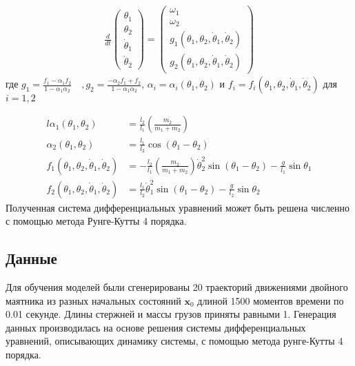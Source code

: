 \documentclass[12pt]{article}
\begin{document}
$$
\begin{array}{c}
\frac{d}{d t}\left(\begin{array}{c}
\theta_{1} \\
\theta_{2} \\
\dot{\theta}_{1} \\
\dot{\theta}_{2}
\end{array}\right)=\left(\begin{array}{c}
\omega_{1} \\
\omega_{2} \\
g_{1}\left(\theta_{1}, \theta_{2}, \dot{\theta}_{1}, \dot{\theta}_{2}\right) \\
g_{2}\left(\theta_{1}, \theta_{2}, \dot{\theta}_{1}, \dot{\theta}_{2}\right)
\end{array}\right)
\end{array}
$$
где $g_{1}=\frac{f_{1}-\alpha_{1} f_{2}}{1-\alpha_{1} \alpha_{2}} \quad, g_{2}=\frac{-\alpha_{2} f_{1}+f_{2}}{1-\alpha_{1} \alpha_{2}}$, $\alpha_{i}=\alpha_{i}\left(\theta_{1}, \theta_{2}\right)$ и $f_{i}=f_{i}\left(\theta_{1}, \theta_{2}, \dot{\theta}_{1}, \dot{\theta}_{2}\right)$ для $i=1,2$

$$
\begin{aligned}{l}
\alpha_{1}\left(\theta_{1}, \theta_{2}\right) & =\frac{l_{2}}{l_{1}}\left(\frac{m_{2}}{m_{1}+m_{2}}\right) \\
\alpha_{2}\left(\theta_{1}, \theta_{2}\right) &=\frac{l_{1}}{l_{2}} \cos \left(\theta_{1}-\theta_{2}\right) \\
f_{1}\left(\theta_{1}, \theta_{2}, \dot{\theta}_{1}, \dot{\theta}_{2}\right) & =-\frac{l_{2}}{l_{1}}\left(\frac{m_{2}}{m_{1}+m_{2}}\right) \dot{\theta}_{2}^{2} \sin \left(\theta_{1}-\theta_{2}\right)-\frac{g}{l_{1}} \sin \theta_{1} \\
f_{2}\left(\theta_{1}, \theta_{2}, \dot{\theta}_{1}, \dot{\theta}_{2}\right) & =\frac{l_{1}}{l_{2}} \dot{\theta}_{1}^{2} \sin \left(\theta_{1}-\theta_{2}\right)-\frac{g}{l_{2}} \sin \theta_{2}
\end{aligned}
$$
Полученная система дифференциальных уравнений может быть решена численно с помощью метода Рунге-Кутты 4 порядка.

\subsection{Данные}

Для обучения моделей были сгенерированы 20 траекторий движениями двойного маятника из разных начальных состояний $\mathbf{x}_0$ длиной 1500 моментов времени по 0.01 секунде. Длины стержней и массы грузов приняты равными 1. Генерация данных производилась на основе решения системы дифференциальных уравнений, описывающих динамику системы, с помощью метода рунге-Кутты 4 порядка.
\end{document}
